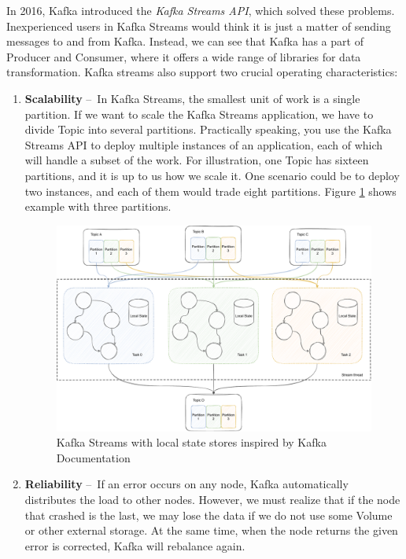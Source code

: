 In 2016, Kafka introduced the \emph{Kafka Streams API}, which solved these problems.
Inexperienced users in Kafka Streams would think it is just a matter of sending messages to and from Kafka.
Instead, we can see that Kafka has a part of Producer and Consumer, where it offers a wide range of libraries for data transformation.
Kafka streams also support two crucial operating characteristics:
\begin{enumerate}[itemsep=1mm, parsep=0pt]
    \item \textbf{Scalability} \---\ In Kafka Streams, the smallest unit of work is a single partition.
    If we want to scale the Kafka Streams application, we have to divide Topic into several partitions.
    Practically speaking, you use the Kafka Streams API to deploy multiple instances of an application, each of which will handle a subset of the work.
    For illustration, one Topic has sixteen partitions, and it is up to us how we scale it.
    One scenario could be to deploy two instances, and each of them would trade eight partitions.
    Figure \ref{fig:kafkaStreams} shows example with three partitions.
    
    \begin{figure}[!h]
    \centering
    \includegraphics[scale=0.48]{obrazky-figures/02-preliminaries/02-kafka/07-kafka-streams-with-localstate,thread.pdf}
    \caption{Kafka Streams with local state stores inspired by Kafka Documentation \cite{kafkaDocumentation}}
    \label{fig:kafkaStreams}
    \end{figure}
    
    
    \item \textbf{Reliability} \---\ If an error occurs on any node, Kafka automatically distributes the load to other nodes.
    However, we must realize that if the node that crashed is the last, we may lose the data if we do not use some Volume or other external storage.
    At the same time, when the node returns the given error is corrected, Kafka will rebalance again.
\end{enumerate}

